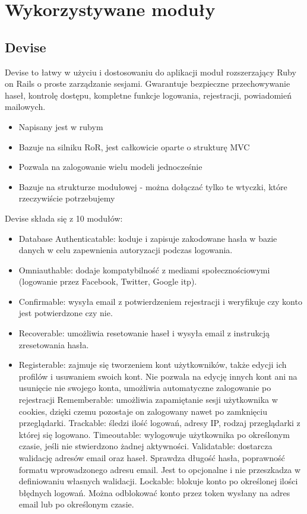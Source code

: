 \chapter{Wykorzystywane moduły}
\section{Devise}
Devise to łatwy w użyciu i dostosowaniu do aplikacji moduł rozszerzający Ruby on Rails o proste zarządzanie sesjami. Gwarantuje bezpieczne przechowywanie haseł, kontrolę dostępu, kompletne funkcje logowania, rejestracji, powiadomień mailowych.

\begin{itemize}
\item Napisany jest w rubym
\item Bazuje na silniku RoR, jest całkowicie oparte o strukturę MVC
\item Pozwala na zalogowanie wielu modeli jednocześnie
\item Bazuje na strukturze modułowej - można dołączać tylko te wtyczki, które rzeczywiście potrzebujemy
\end{itemize}

Devise składa się z 10 modułów:

\begin{itemize}
\item Database Authenticatable: koduje i zapisuje zakodowane hasła w bazie danych w celu zapewnienia autoryzacji podczas logowania.
\item Omniauthable: dodaje kompatybilność z mediami społecznościowymi (logowanie przez Facebook, Twitter, Google itp). 
\item Confirmable: wysyła email z potwierdzeniem rejestracji i weryfikuje czy konto jest potwierdzone czy nie.
\item Recoverable: umożliwia resetowanie haseł i wysyła email z instrukcją zresetowania hasła.
\item Registerable: zajmuje się tworzeniem kont użytkowników, także edycji ich profilów i usuwaniem swoich kont. Nie pozwala na edycję innych kont ani na usunięcie nie swojego konta, umożliwia automatyczne zalogowanie po rejestracji
Rememberable: umożliwia zapamiętanie sesji użytkownika w cookies, dzięki czemu pozostaje on zalogowany nawet po zamknięciu przeglądarki.
Trackable: śledzi ilość logowań, adresy IP, rodzaj przeglądarki z której się logowano.
Timeoutable: wylogowuje użytkownika po określonym czasie, jeśli nie stwierdzono żadnej aktywności.
Validatable: dostarcza walidację adresów email oraz haseł. Sprawdza długość hasła, poprawność formatu wprowadzonego adresu email. Jest to opcjonalne i nie przeszkadza w definiowaniu własnych walidacji.
Lockable: blokuje konto po określonej ilości błędnych logowań. Można odblokować konto przez token wysłany na adres email lub po określonym czasie.

\end{itemize}

